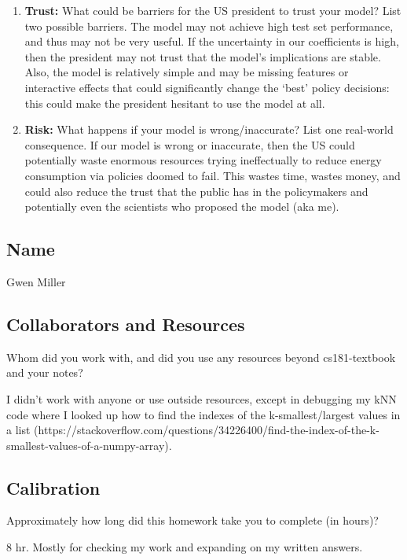 \documentclass[submit]{harvardml}
\begin{document}
\begin{enumerate}
  \item \textbf{Trust:} What could be barriers for the US president to trust your model?  List two possible barriers. 
    \subitem The model may not achieve high test set performance, and thus may not be very useful. If the uncertainty in our coefficients is high, then the president may not trust that the model's implications are stable. Also, the model is relatively simple and may be missing features or interactive effects that could significantly change the `best' policy decisions: this could make the president hesitant to use the model at all.
  \item \textbf{Risk:} What happens if your model is wrong/inaccurate?  List one real-world consequence. 
    \subitem If our model is wrong or inaccurate, then the US could potentially waste enormous resources trying ineffectually to reduce energy consumption via policies doomed to fail. This wastes time, wastes money, and could also reduce the trust that the public has in the policymakers and potentially even the scientists who proposed the model (aka me).
  
  \end{enumerate}
\newpage

\subsection*{Name} Gwen Miller

\subsection*{Collaborators and Resources}
Whom did you work with, and did you use any resources beyond cs181-textbook and your notes?

I didn't work with anyone or use outside resources, except in debugging my kNN code where I looked up how to find the indexes of the k-smallest/largest values in a list (https://stackoverflow.com/questions/34226400/find-the-index-of-the-k-smallest-values-of-a-numpy-array).

\subsection*{Calibration}
Approximately how long did this homework take you to complete (in hours)? 

8 hr. Mostly for checking my work and expanding on my written answers.
\end{document}
